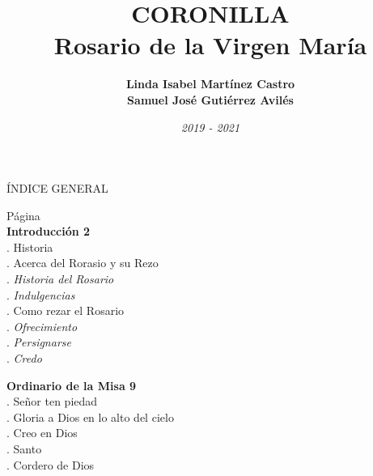 \documentclass[12pt, letterpaper]{report}
\title{
  \textbf{ \Huge CORONILLA } \\
  \LARGE Rosario de la Virgen María %
}
\author{ 
  \Large \textbf{Linda Isabel Mart\'inez Castro} \\ 
  \Large \textbf{Samuel Jos\'e Guti\'errez Avil\'es}
}
\date{ \LARGE \small \textit{2019 - 2021} }
\begin{document}

    \maketitle
    
    \LARGE ÍNDICE GENERAL

    \large \hfill{Página}\\
    \Large \textbf{Introducción \hfill{2}}\\
    .\hspace{1cm} \large Historia \\
    .\hspace{1cm} \large Acerca del Rorasio y su Rezo \\
    .\hspace{2cm} \large \textit{Historia del Rosario} \\
    .\hspace{2cm} \large \textit{Indulgencias} \\
    .\hspace{1cm} \large Como rezar el Rosario \\
    .\hspace{2cm} \large \textit{Ofrecimiento} \\
    .\hspace{2cm} \large \textit{Persignarse} \\
    .\hspace{2cm} \large \textit{Credo} 

    \noindent
    \Large \textbf{Ordinario de la Misa \hfill{9}}\\
    .\hspace{1cm} \large Señor ten piedad \\
    .\hspace{1cm} \large Gloria a Dios en lo alto del cielo \\
    .\hspace{1cm} \large Creo en Dios \\
    .\hspace{1cm} \large Santo \\
    .\hspace{1cm} \large Cordero de Dios 
\end{document}
